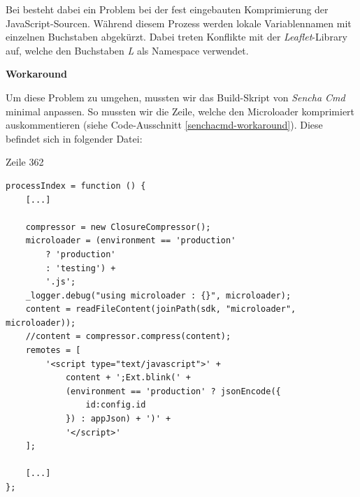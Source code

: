 Bei \kort besteht dabei ein Problem bei der fest eingebauten Komprimierung der JavaScript-Sourcen.
Während diesem Prozess werden lokale Variablennamen mit einzelnen Buchstaben abgekürzt.
Dabei treten Konflikte mit der \emph{Leaflet}-Library auf, welche den Buchstaben \emph{L} als Namespace verwendet.

\textbf{Workaround}

Um diese Problem zu umgehen, mussten wir das Build-Skript von \emph{Sencha Cmd} minimal anpassen.
So mussten wir die Zeile, welche den \gls{Microloader} komprimiert auskommentieren (siehe Code-Ausschnitt \ref{senchacmd-workaround}).
Diese befindet sich in folgender Datei:

 Zeile 362

\lstset{language=JavaScript}
\begin{lstlisting}[caption=Sencha Cmd Workaround, label=senchacmd-workaround]
processIndex = function () {
	[...]
	
	compressor = new ClosureCompressor();
	microloader = (environment == 'production'
		? 'production'
		: 'testing') +
		'.js';
	_logger.debug("using microloader : {}", microloader);
	content = readFileContent(joinPath(sdk, "microloader", microloader));
	//content = compressor.compress(content);
	remotes = [
		'<script type="text/javascript">' +
			content + ';Ext.blink(' +
			(environment == 'production' ? jsonEncode({
				id:config.id
			}) : appJson) + ')' +
			'</script>'
	];
	
	[...]
};
\end{lstlisting}